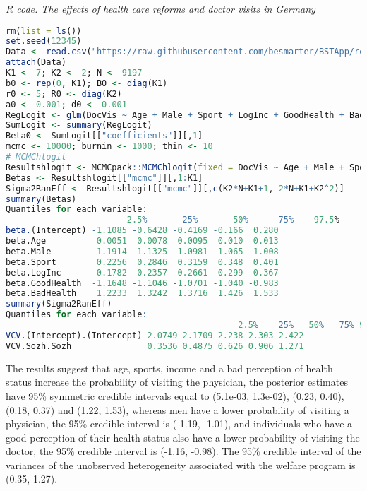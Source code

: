 \begin{tcolorbox}[enhanced,width=4.67in,center upper,
	fontupper=\large\bfseries,drop shadow southwest,sharp corners]
	\textit{R code. The effects of health care reforms and doctor visits in Germany}
	\begin{VF}
		\begin{lstlisting}[language=R]
rm(list = ls())
set.seed(12345)
Data <- read.csv("https://raw.githubusercontent.com/besmarter/BSTApp/refs/heads/master/DataApp/9VisitDoc.csv", sep = ",", header = TRUE, quote = "")
attach(Data)
K1 <- 7; K2 <- 2; N <- 9197
b0 <- rep(0, K1); B0 <- diag(K1)
r0 <- 5; R0 <- diag(K2)
a0 <- 0.001; d0 <- 0.001
RegLogit <- glm(DocVis ~ Age + Male + Sport + LogInc + GoodHealth + BadHealth, family = binomial(link = "logit"))
SumLogit <- summary(RegLogit)
Beta0 <- SumLogit[["coefficients"]][,1]
mcmc <- 10000; burnin <- 1000; thin <- 10
# MCMChlogit
Resultshlogit <- MCMCpack::MCMChlogit(fixed = DocVis ~ Age + Male + Sport + LogInc + GoodHealth + BadHealth, random = ~Sozh, group="id", data = Data, burnin = burnin, mcmc = mcmc, thin = thin, mubeta = b0, Vbeta = B0, r = r0, R = R0, nu = a0, delta = d0, beta.start = Beta0, FixOD = 1)
Betas <- Resultshlogit[["mcmc"]][,1:K1]
Sigma2RanEff <- Resultshlogit[["mcmc"]][,c(K2*N+K1+1, 2*N+K1+K2^2)]
summary(Betas)
Quantiles for each variable:
						2.5%       25%       50%      75%    97.5%
beta.(Intercept) -1.1085 -0.6428 -0.4169 -0.166  0.280
beta.Age          0.0051  0.0078  0.0095  0.010  0.013
beta.Male        -1.1914 -1.1325 -1.0981 -1.065 -1.008
beta.Sport        0.2256  0.2846  0.3159  0.348  0.401
beta.LogInc       0.1782  0.2357  0.2661  0.299  0.367
beta.GoodHealth  -1.1648 -1.1046 -1.0701 -1.040 -0.983
beta.BadHealth    1.2233  1.3242  1.3716  1.426  1.533
summary(Sigma2RanEff)
Quantiles for each variable:
								              2.5%    25%   50%   75% 97.5%
VCV.(Intercept).(Intercept) 2.0749 2.1709 2.238 2.303 2.422
VCV.Sozh.Sozh               0.3536 0.4875 0.626 0.906 1.271
\end{lstlisting}
	\end{VF}
\end{tcolorbox}

The results suggest that age, sports, income and a bad perception of health status increase the probability of visiting the physician, the posterior estimates have 95\% symmetric credible intervals equal to (5.1e-03, 1.3e-02), (0.23, 0.40), (0.18, 0.37) and (1.22, 1.53), whereas men have a lower probability of visiting a physician, the 95\% credible interval is (-1.19, -1.01), and individuals who have a good perception of their health status also have a lower probability of visiting the doctor, the 95\% credible interval is (-1.16, -0.98). The 95\% credible interval of the variances of the unobserved heterogeneity associated with the welfare program is (0.35, 1.27).\\

